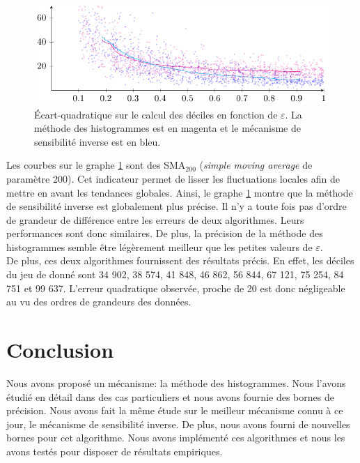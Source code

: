 \begin{figure}[H]
    \centering
    \includegraphics[clip]{"./proofs/figures/cdoRBCZD8XdSJKfP.pdf"}
    \caption{Écart-quadratique sur le calcul des déciles en fonction de \(\varepsilon\). La méthode des histogrammes est en {\color{magenta} magenta} et le mécanisme de sensibilité inverse est en {\color{blue} bleu}.}
    \label{fig2}
\end{figure}

Les courbes sur le graphe \ref{fig2} sont des SMA\(_{200}\) (\textit{simple moving average} de paramètre 200). Cet indicateur permet de lisser les fluctuations locales afin de mettre en avant les tendances globales. Ainsi, le graphe \ref{fig2} montre que la méthode de sensibilité inverse est globalement plus précise. Il n'y a toute fois pas d'ordre de grandeur de différence entre les erreurs de deux algorithmes. Leurs performances sont donc similaires. De plus, la précision de la méthode des histogrammes semble être légèrement meilleur que les petites valeurs de \(\varepsilon\).\\

De plus, ces deux algorithmes fournissent des résultats précis. En effet, les déciles du jeu de donné sont 34 902, 38 574, 41 848, 46 862, 56 844, 67 121, 75 254, 84 751 et 99 637. L'erreur quadratique observée, proche de 20 est donc négligeable au vu des ordres de grandeurs des données.

\section*{Conclusion}

Nous avons proposé un mécanisme: la méthode des histogrammes. Nous l'avons étudié en détail dans des cas particuliers et nous avons fournie des bornes de précision. Nous avons fait la même étude sur le meilleur mécanisme connu à ce jour, le mécanisme de sensibilité inverse. De plus, nous avons fourni de nouvelles bornes pour cet algorithme. Nous avons implémenté ces algorithmes et nous les avons testés pour disposer de résultats empiriques.\\

